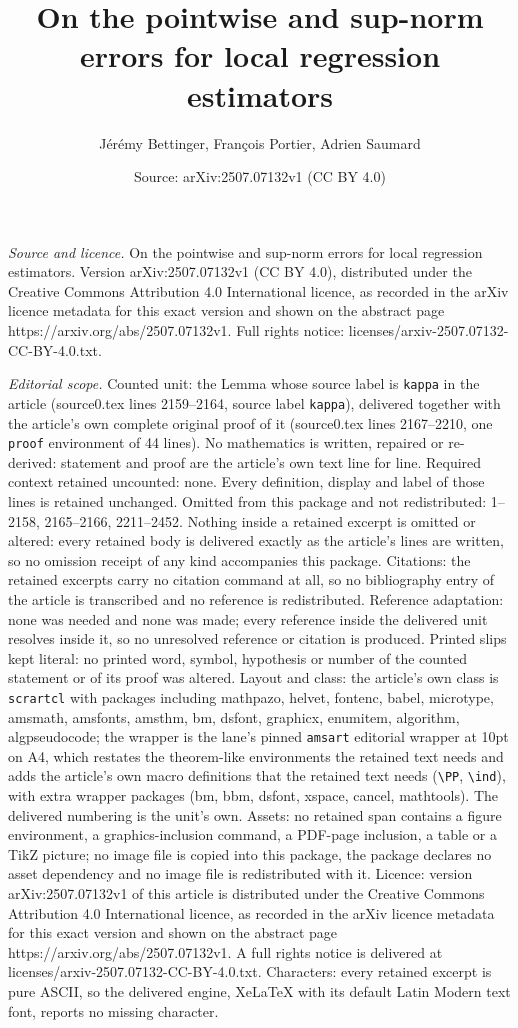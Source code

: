 \documentclass[10pt,a4paper]{amsart}
\title[On the pointwise and sup-norm errors for local regression es]{On the pointwise and sup-norm errors for local regression estimators}
\author{J\'er\'emy Bettinger, Fran\c{c}ois Portier, Adrien Saumard}
\date{Source: arXiv:2507.07132v1 (CC BY 4.0)}
\begin{document}
\maketitle

\noindent\emph{Source and licence.} On the pointwise and sup-norm errors for local regression estimators. Version arXiv:2507.07132v1 (CC BY 4.0), distributed under the Creative Commons Attribution 4.0 International licence, as recorded in the arXiv licence metadata for this exact version and shown on the abstract page https://arxiv.org/abs/2507.07132v1. Full rights notice: licenses/arxiv-2507.07132-CC-BY-4.0.txt.\par\smallskip

\noindent\textit{Editorial scope.} Counted unit: the Lemma whose source label is \texttt{kappa} in the article (source0.tex lines 2159--2164, source label \texttt{kappa}), delivered together with the article's own complete original proof of it (source0.tex lines 2167--2210, one \texttt{proof} environment of 44 lines). No mathematics is written, repaired or re-derived: statement and proof are the article's own text line for line. Required context retained uncounted: none. Every definition, display and label of those lines is retained unchanged. Omitted from this package and not redistributed: 1--2158, 2165--2166, 2211--2452. Nothing inside a retained excerpt is omitted or altered: every retained body is delivered exactly as the article's lines are written, so no omission receipt of any kind accompanies this package. Citations: the retained excerpts carry no citation command at all, so no bibliography entry of the article is transcribed and no reference is redistributed. Reference adaptation: none was needed and none was made; every reference inside the delivered unit resolves inside it, so no unresolved reference or citation is produced. Printed slips kept literal: no printed word, symbol, hypothesis or number of the counted statement or of its proof was altered. Layout and class: the article's own class is \texttt{scrartcl} with packages including mathpazo, helvet, fontenc, babel, microtype, amsmath, amsfonts, amsthm, bm, dsfont, graphicx, enumitem, algorithm, algpseudocode; the wrapper is the lane's pinned \texttt{amsart} editorial wrapper at 10pt on A4, which restates the theorem-like environments the retained text needs and adds the article's own macro definitions that the retained text needs (\texttt{\textbackslash PP}, \texttt{\textbackslash ind}), with extra wrapper packages (bm, bbm, dsfont, xspace, cancel, mathtools). The delivered numbering is the unit's own. Assets: no retained span contains a figure environment, a graphics-inclusion command, a PDF-page inclusion, a table or a TikZ picture; no image file is copied into this package, the package declares no asset dependency and no image file is redistributed with it. Licence: version arXiv:2507.07132v1 of this article is distributed under the Creative Commons Attribution 4.0 International licence, as recorded in the arXiv licence metadata for this exact version and shown on the abstract page https://arxiv.org/abs/2507.07132v1. A full rights notice is delivered at licenses/arxiv-2507.07132-CC-BY-4.0.txt. Characters: every retained excerpt is pure ASCII, so the delivered engine, XeLaTeX with its default Latin Modern text font, reports no missing character.
\end{document}
